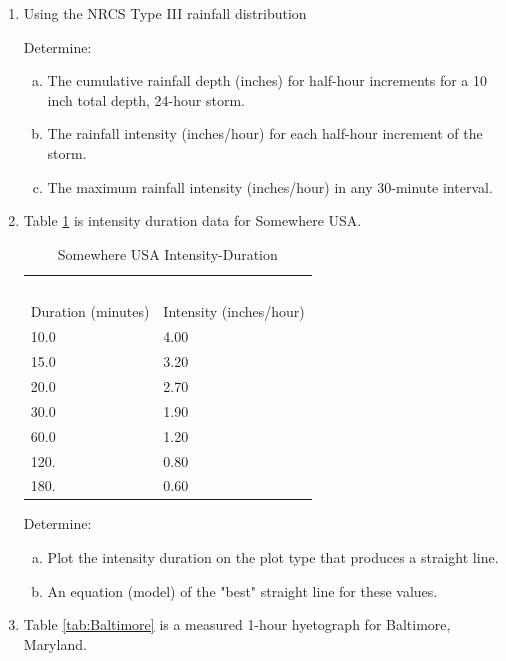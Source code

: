 \documentclass[12pt]{article}
\begin{document}
\begin{enumerate}
\clearpage

\item Using the NRCS Type III rainfall distribution

Determine:
    \begin{enumerate}[a)]
        \item The cumulative rainfall depth (inches) for half-hour increments for a 10 inch total depth, 24-hour storm.
        \item The rainfall intensity (inches/hour) for each half-hour increment of the storm. 
        \item The maximum rainfall intensity (inches/hour) in any 30-minute interval.  
    \end{enumerate}

\clearpage



\item Table \ref{tab:SomewhereUSARainIDF} is intensity duration data for Somewhere USA.

\begin{table}[h!]
\centering
\caption{Somewhere USA Intensity-Duration}
\begin{tabular}{p{2.0in}p{2.0in}} %
~&~\\
Duration (minutes) & Intensity (inches/hour) \\
\hline
\hline
10.0 & 4.00 \\
15.0 & 3.20 \\
20.0 & 2.70 \\
30.0 & 1.90 \\
60.0 & 1.20 \\
120. & 0.80 \\
180. & 0.60 \\
\hline
\end{tabular}
\label{tab:SomewhereUSARainIDF}
\end{table}

Determine:
    \begin{enumerate}[a)]
        \item Plot the intensity duration on the plot type that produces a straight line.
        \item An equation (model) of the "best" straight line for these values. 
    \end{enumerate}

\clearpage

\item Table \ref{tab:Baltimore} is a measured 1-hour hyetograph for Baltimore, Maryland.


\end{enumerate}
\end{document}

